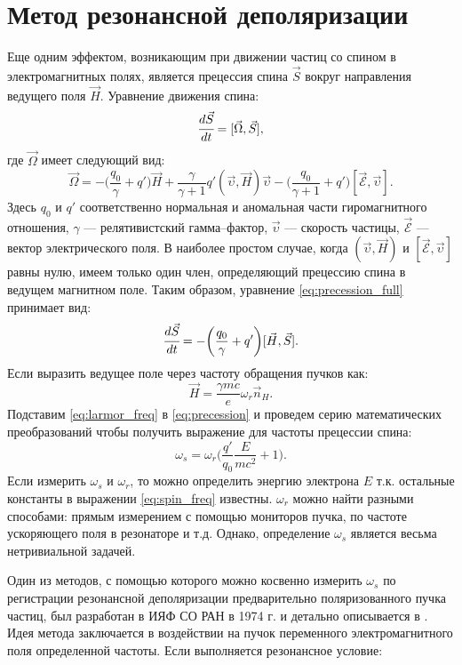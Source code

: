 \section{Метод резонансной деполяризации}
Еще одним эффектом, возникающим при движении частиц со спином в электромагнитных полях, является прецессия спина $\vec{S}$ вокруг направления ведущего поля $\vec{H}$. Уравнение движения спина:
\begin{equation}
\cfrac{d\vec{S}}{dt} = [\vec{\Omega},\vec{S}],
\label{eq:precession_full}
\end{equation}
где $\vec{\Omega}$ имеет следующий вид:
\begin{equation}
\vec{\Omega} = -\biggl(\frac{q_0}{\gamma}+q'\biggr) \vec{H} + \frac{\gamma}{\gamma + 1}q' (\vec{\upsilon},\vec{H})\vec{\upsilon}- \biggl(\frac{q_0}{\gamma+1}  + q'\biggr)[\vec{\mathcal{E}},\vec{\upsilon}].
\end{equation}%
Здесь $q_0$ и $q'$ соответственно нормальная и аномальная части гиромагнитного отношения, $\gamma$ --- релятивистский гамма--фактор, $\vec{\upsilon}$ --- скорость частицы, $\vec{\mathcal{E}}$ --- вектор электрического поля.
В наиболее простом случае, когда $(\vec{\upsilon}, \vec{H})$ и $[\vec{\mathcal{E}},\vec{\upsilon}]$ равны нулю, имеем только один член, определяющий прецессию спина в ведущем магнитном поле. Таким образом, уравнение \ref{eq:precession_full} принимает вид:
\begin{equation}
\cfrac{d\vec{S}}{dt} = -\biggl(\frac{q_0}{\gamma}+q'\biggr) [\vec{H}, \vec{S}].
\label{eq:precession}
\end{equation}%
Если выразить ведущее поле через частоту обращения пучков как: 
\begin{equation}
\vec{H} = \frac {\gamma mc}{e}\omega_r\vec{n}_H.
\label{eq:larmor_freq}
\end{equation}
Подставим \ref{eq:larmor_freq} в \ref{eq:precession} и проведем серию математических преобразований чтобы получить выражение для частоты прецессии спина:
\begin{equation}
\omega_s=  \omega_{r}\bigg(\frac{q'}{q_0}\frac{E}{mc^2}+1\bigg).
\label{eq:spin_freq}
\end{equation}
Если измерить $\omega_s$ и $\omega_{r}$, то можно определить энергию электрона $E$ т.к. остальные константы в выражении \ref{eq:spin_freq} известны. $\omega_{r}$ можно найти разными способами: прямым измерением с помощью мониторов пучка, по частоте ускоряющего поля в резонаторе и т.д. Однако, определение $\omega_s$ является весьма нетривиальной задачей. 
\par Один из методов, с помощью которого можно косвенно измерить  $\omega_s$ по регистрации резонансной деполяризации предварительно поляризованного пучка частиц, был разработан в ИЯФ СО РАН в 1974 г. и детально описывается в \cite{MRD}. Идея метода заключается в воздействии на пучок переменного электромагнитного поля определенной частоты. Если выполняется резонансное условие:
